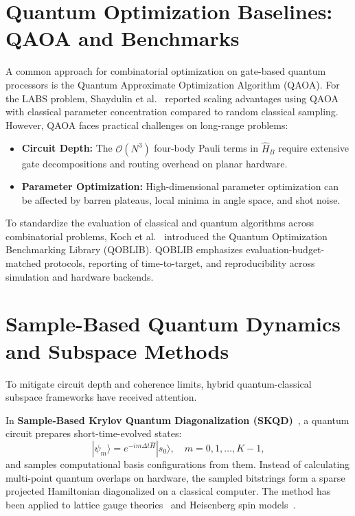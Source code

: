\documentclass[12pt,a4paper]{report}
\begin{document}
\section{Quantum Optimization Baselines: QAOA and Benchmarks}
\label{sec:quantum_optimization}
A common approach for combinatorial optimization on gate-based quantum processors is the Quantum Approximate Optimization Algorithm (QAOA). For the LABS problem, Shaydulin et al.~\cite{shaydulin2024} reported scaling advantages using QAOA with classical parameter concentration compared to random classical sampling. However, QAOA faces practical challenges on long-range problems:
\begin{itemize}
    \item \textbf{Circuit Depth:} The $\mathcal{O}(N^3)$ four-body Pauli terms in $\hat{H}_B$ require extensive gate decompositions and routing overhead on planar hardware.
    \item \textbf{Parameter Optimization:} High-dimensional parameter optimization can be affected by barren plateaus, local minima in angle space, and shot noise.
\end{itemize}

To standardize the evaluation of classical and quantum algorithms across combinatorial problems, Koch et al.~\cite{koch2026} introduced the Quantum Optimization Benchmarking Library (QOBLIB). QOBLIB emphasizes evaluation-budget-matched protocols, reporting of time-to-target, and reproducibility across simulation and hardware backends.

\section{Sample-Based Quantum Dynamics and Subspace Methods}
\label{sec:sample_based_methods}
To mitigate circuit depth and coherence limits, hybrid quantum-classical subspace frameworks have received attention.

In \textbf{Sample-Based Krylov Quantum Diagonalization (SKQD)}~\cite{yu2025}, a quantum circuit prepares short-time-evolved states:
\begin{equation}
    |\psi_m\rangle = e^{-i m \Delta t \hat{H}} |s_0\rangle, \quad m = 0, 1, \dots, K-1,
\end{equation}
and samples computational basis configurations from them. Instead of calculating multi-point quantum overlaps on hardware, the sampled bitstrings form a sparse projected Hamiltonian diagonalized on a classical computer. The method has been applied to lattice gauge theories~\cite{rosanowski2025} and Heisenberg spin models~\cite{misciasci2026}.
\end{document}
